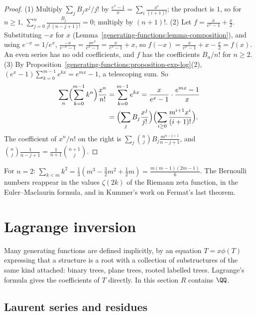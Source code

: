 \begin{proof}
(1) Multiply $\sum_jB_jx^j/j!$ by $\frac{e^x - 1}{x} = \sum_i\frac{x^i}{(i+1)!}$; the product is $1$, so for $n \geq 1$, $\sum_{j=0}^{n}\frac{B_j}{j!\,(n - j + 1)!} = 0$; multiply by $(n + 1)!$.
(2) Let $f = \frac{x}{e^x - 1} + \frac{x}{2}$. Substituting $-x$ for $x$ (Lemma~\ref{generating-functions:lemma-composition}), and using $e^{-x} = 1/e^x$,
$\frac{-x}{e^{-x} - 1} = \frac{xe^x}{e^x - 1} = \frac{x}{e^x - 1} + x$, so $f(-x) = \frac{x}{e^x - 1} + x - \frac{x}{2} = f(x)$. An even series has no odd coefficients, and $f$ has the
coefficients $B_n/n!$ for $n \geq 2$.
(3) By Proposition~\ref{generating-functions:proposition-exp-log}(2), $(e^x - 1)\sum_{k=0}^{m-1}e^{kx} = e^{mx} - 1$, a telescoping sum. So
\[
\begin{aligned}
\sum_{n}\Bigl(\sum_{k=0}^{m-1}k^n\Bigr)\frac{x^n}{n!} &= \sum_{k=0}^{m-1}e^{kx} = \frac{x}{e^x - 1} \cdot \frac{e^{mx} - 1}{x}\\
&= \Bigl(\sum_jB_j\frac{x^j}{j!}\Bigr)\Bigl(\sum_{i \geq 0}\frac{m^{i+1}x^i}{(i + 1)!}\Bigr).
\end{aligned}
\]
The coefficient of $x^n/n!$ on the right is $\sum_{j}\binom{n}{j}B_j\frac{m^{n-j+1}}{n - j + 1}$, and $\binom{n}{j}\frac{1}{n - j + 1} = \frac{1}{n + 1}\binom{n + 1}{j}$.
\end{proof}

For $n = 2$: $\sum_{k<m}k^2 = \frac13(m^3 - \frac32m^2 + \frac12m) = \frac{m(m - 1)(2m - 1)}{6}$. The Bernoulli numbers reappear in the values $\zeta(2k)$ of the Riemann zeta function, in the
Euler--Maclaurin formula, and in Kummer's work on Fermat's last theorem.

\section{Lagrange inversion}\label{generating-functions:section-lagrange}

Many generating functions are defined implicitly, by an equation $T = x\phi(T)$ expressing that a structure is a root with a collection of substructures of the same kind attached: binary trees,
plane trees, rooted labelled trees. Lagrange's formula gives the coefficients of $T$ directly. In this section $R$ contains $\QQ$.

\subsection{Laurent series and residues}\label{generating-functions:subsection-laurent}

